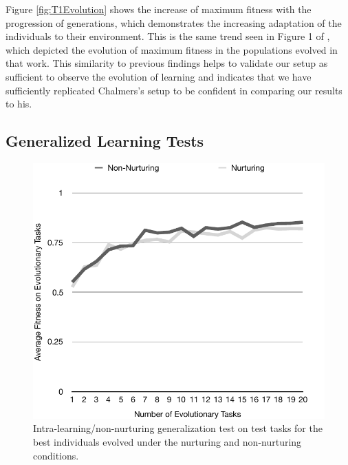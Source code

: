\documentclass[master]{outhesis}
\begin{document}
Figure \ref{fig:T1Evolution} shows the increase of maximum fitness with the progression of generations,
which demonstrates the increasing adaptation of the individuals to their environment.
This is the same trend seen in Figure 1 of \citet{Chalmers:1990aa}, which depicted the evolution of maximum fitness in the populations evolved in that work.
This similarity to previous findings helps to validate our setup as sufficient to observe the evolution of learning
and indicates that we have sufficiently replicated Chalmers's setup to be confident in comparing our results to his.

\subsection{Generalized Learning Tests}

\begin{figure}[h]
	\centering
	\includegraphics{T1IntraLearningGeneralizationTest.pdf}
	\caption{Intra-learning/non-nurturing generalization test on test tasks for the best individuals evolved under the nurturing and non-nurturing conditions.}
	\label{fig:T1IntraLearningGeneralizationTest}
\end{figure}
\end{document}

